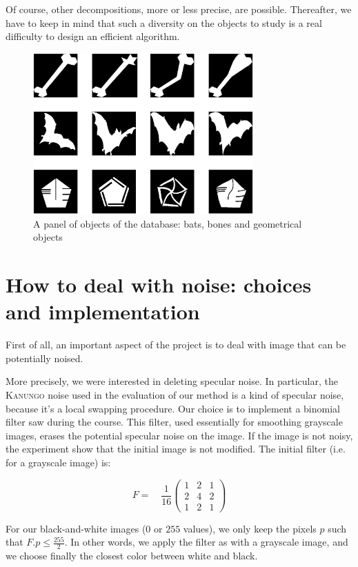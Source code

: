 \label{categories}

Of course, other decompositions, more or less precise, are possible. Thereafter, we have to keep in mind that such a diversity on the objects to study is a real difficulty to design an efficient algorithm.

\begin{figure}[!ht]
    \centering
    \includegraphics[height=175pt]{images/shapedata.eps}
	\caption{A panel of objects of the database: bats, bones and geometrical objects}
	\label{shapedata}
\end{figure}


\section{How to deal with noise: choices and implementation}

\label{filter}

First of all, an important aspect of the project is to deal with image that can be potentially noised.

More precisely, we were interested in deleting specular noise. In particular, the \textsc{Kanungo} noise used in the evaluation of our method is a kind of specular noise, because it's a local swapping procedure. Our choice is to implement a binomial filter saw during the course. This filter, used essentially for smoothing grayscale images, erases the potential specular noise on the image. If the image is not noisy, the experiment show that the initial image is not modified. The initial filter (i.e. for a grayscale image) is:

\setcounter{MaxMatrixCols}{3}
\[ F = \quad \frac{1}{16} \begin{pmatrix}
1 & 2 & 1 \\
2 & 4 & 2 \\
1 & 2 & 1
\end{pmatrix}\]

For our black-and-white images ($0$ or $255$ values), we only keep the pixels $p$ such that $F.p \leq \frac{255}{2}$. In other words, we apply the filter as with a grayscale image, and we choose finally the closest color between white and black.

